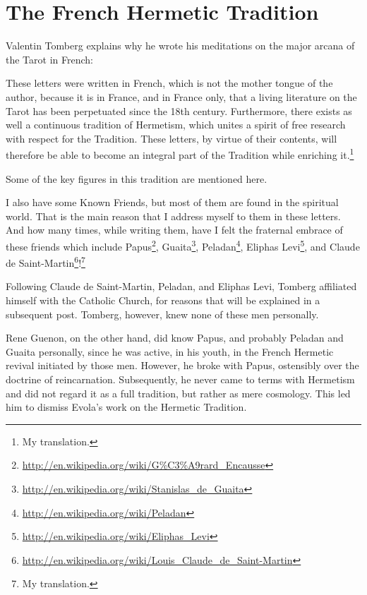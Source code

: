 \section{The French Hermetic Tradition}

Valentin Tomberg explains why he wrote his meditations on the major arcana of the Tarot in French:

\begin{quotex}
These letters were written in French, which is not the mother tongue of the author, because it is in France, and in France only, that a living literature on the Tarot has been perpetuated since the 18th century. Furthermore, there exists as well a continuous tradition of Hermetism, which unites a spirit of free research with respect for the Tradition. These letters, by virtue of their contents, will therefore be able to become an integral part of the Tradition while enriching it.\footnote{My translation.} 
\end{quotex}


Some of the key figures in this tradition are mentioned here.

\begin{quotex}
I also have some Known Friends, but most of them are found in the spiritual world. That is the main reason that I address myself to them in these letters. And how many times, while writing them, have I felt the fraternal embrace of these friends which include Papus\footnote{\url{http://en.wikipedia.org/wiki/G\%C3\%A9rard\_Encausse}}, Guaita\footnote{\url{http://en.wikipedia.org/wiki/Stanislas\_de\_Guaita}}, Peladan\footnote{\url{http://en.wikipedia.org/wiki/Peladan}}, Eliphas Levi\footnote{\url{http://en.wikipedia.org/wiki/Eliphas\_Levi}}, and Claude de Saint-Martin\footnote{\url{http://en.wikipedia.org/wiki/Louis\_Claude\_de\_Saint-Martin}}!\footnote{My translation.}
\end{quotex}


Following Claude de Saint-Martin, Peladan, and Eliphas Levi, Tomberg affiliated himself with the Catholic Church, for reasons that will be explained in a subsequent post. Tomberg, however, knew none of these men personally.

Rene Guenon, on the other hand, did know Papus, and probably Peladan and Guaita personally, since he was active, in his youth, in the French Hermetic revival initiated by those men. However, he broke with Papus, ostensibly over the doctrine of reincarnation. Subsequently, he never came to terms with Hermetism and did not regard it as a full tradition, but rather as mere cosmology. This led him to dismiss Evola's work on the Hermetic Tradition.

